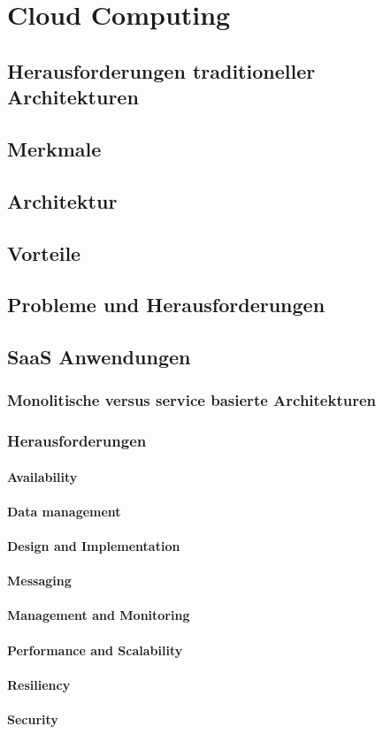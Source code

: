 \chapter{Cloud Computing} 
\label{ch:cloud}

\section{Herausforderungen traditioneller Architekturen}
\section{Merkmale}
\section{Architektur}
\section{Vorteile}
\section{Probleme und Herausforderungen}
\section{SaaS Anwendungen}
\subsection{Monolitische versus service basierte Architekturen}
\subsection{Herausforderungen}
\subsubsection{Availability}
\subsubsection{Data management}
\subsubsection{Design and Implementation}
\subsubsection{Messaging}
\subsubsection{Management and Monitoring}
\subsubsection{Performance and Scalability}
\subsubsection{Resiliency}
\subsubsection{Security}


